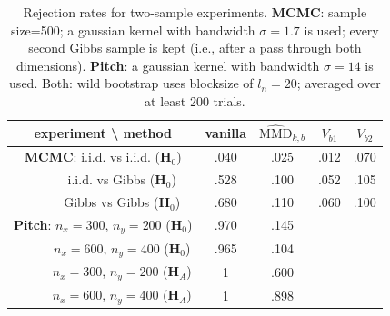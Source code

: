 \documentclass{article} %
\begin{document}
% 
\begin{table}\caption{Rejection rates for two-sample experiments. {\bf MCMC}: sample size=500; a gaussian kernel with bandwidth
$\sigma=1.7$ is used; every second Gibbs sample is kept (i.e., after a pass
through both dimensions). {\bf Pitch}: a gaussian kernel with bandwidth
$\sigma=14$ is used. Both: wild bootstrap
uses blocksize of $l_n=20$; averaged over at least 200 trials.}
\label{tab:gibbs_mmd}
\centering{}
\begin{tabular}{|c|c|c|c|c|}
\hline 
{\footnotesize experiment \textbackslash{} method} & {\footnotesize vanilla} & {\footnotesize $\widehat{\text{MMD}}_{k,b}$} & {\footnotesize $V_{b1}$} & {\footnotesize $V_{b2}$}\tabularnewline
\hline 
\multicolumn{1}{|c|}{\textbf{\footnotesize MCMC}{\footnotesize : i.i.d. vs i.i.d. ($\mathbf{H}_{0}$)}} & {\small .040} & {\small .025} & {\small .012}\textbf{\small{} } & {\small .070}\tabularnewline
\hline 
{\footnotesize $\qquad\quad$i.i.d. vs Gibbs ($\mathbf{H}_{0}$)} & {\small .528 } & {\small .100} & {\small .052} & {\small .105}\tabularnewline
\hline 
{\footnotesize $\qquad\quad$Gibbs vs Gibbs ($\mathbf{H}_{0}$)} & {\small .680 } & {\small .110} & {\small .060} & {\small .100}\tabularnewline
\hline 
\textbf{\footnotesize Pitch}{\footnotesize : $n_{x}=300$, $n_{y}=200$
($\mathbf{H}_{0}$)} & {\small .970} & {\small .145} & \multicolumn{1}{c}{} & \multicolumn{1}{c}{}\tabularnewline
\cline{1-3} 
{\footnotesize $\qquad\quad n_{x}=600$, $n_{y}=400$ ($\mathbf{H}_{0}$)} & {\small .965} & {\small .104} & \multicolumn{1}{c}{} & \multicolumn{1}{c}{}\tabularnewline
\cline{1-3} 
{\footnotesize $\qquad\quad n_{x}=300$, $n_{y}=200$ ($\mathbf{H}_{A}$)} & {\small 1} & {\small .600} & \multicolumn{1}{c}{} & \multicolumn{1}{c}{}\tabularnewline
\cline{1-3} 
{\footnotesize $\qquad\quad n_{x}=600$, $n_{y}=400$ ($\mathbf{H}_{A}$)} & {\small 1} & {\small .898} & \multicolumn{1}{c}{} & \multicolumn{1}{c}{}\tabularnewline
\cline{1-3} 
\end{tabular}
\end{table}
\end{document}
